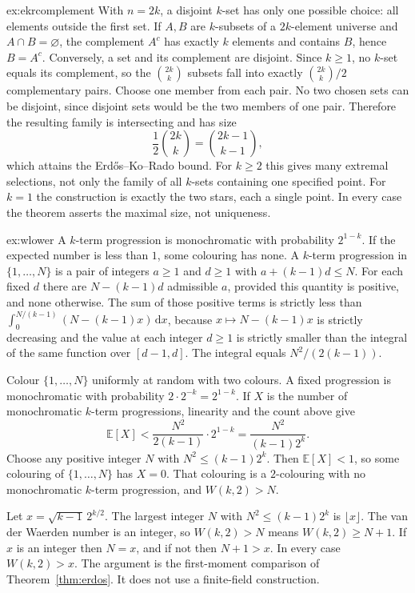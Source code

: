 \begin{solution}{ex:ekrcomplement}
\idea With $n=2k$, a disjoint $k$-set has only one possible choice: all elements outside the first set.
\writeup If $A,B$ are $k$-subsets of a $2k$-element universe and $A\cap B=\varnothing$, the complement $A^c$ has exactly $k$ elements and contains $B$, hence $B=A^c$. Conversely, a set and its complement are disjoint. Since $k\ge1$, no $k$-set equals its complement, so the $\binom{2k}{k}$ subsets fall into exactly $\binom{2k}{k}/2$ complementary pairs. Choose one member from each pair. No two chosen sets can be disjoint, since disjoint sets would be the two members of one pair. Therefore the resulting family is intersecting and has size
\[
 \frac12\binom{2k}{k}=\binom{2k-1}{k-1},
\]
which attains the Erd\H os--Ko--Rado bound. For $k\ge 2$ this gives many extremal selections, not only the family of all $k$-sets containing one specified point. For $k=1$ the construction is exactly the two stars, each a single point. In every case the theorem asserts the maximal size, not uniqueness.
\end{solution}


\begin{solution}{ex:wlower}
\idea A $k$-term progression is monochromatic with probability $2^{1-k}$. If the expected number is less than $1$, some colouring has none.
\writeup A $k$-term progression in $\{1,\ldots,N\}$ is a pair of integers $a\ge1$ and $d\ge1$ with $a+(k-1)d\le N$. For each fixed $d$ there are $N-(k-1)d$ admissible $a$, provided this quantity is positive, and none otherwise. The sum of those positive terms is strictly less than $\int_0^{N/(k-1)}(N-(k-1)x)\,\mathrm dx$, because $x\mapsto N-(k-1)x$ is strictly decreasing and the value at each integer $d\ge1$ is strictly smaller than the integral of the same function over $[d-1,d]$. The integral equals $N^2/(2(k-1))$.

Colour $\{1,\ldots,N\}$ uniformly at random with two colours. A fixed progression is monochromatic with probability $2\cdot 2^{-k}=2^{1-k}$. If $X$ is the number of monochromatic $k$-term progressions, linearity and the count above give
\[
 \mathbb E[X]<\frac{N^2}{2(k-1)}\cdot 2^{1-k}=\frac{N^2}{(k-1)2^{k}}.
\]
Choose any positive integer $N$ with $N^2\le(k-1)2^k$. Then $\mathbb E[X]<1$, so some colouring of $\{1,\ldots,N\}$ has $X=0$. That colouring is a $2$-colouring with no monochromatic $k$-term progression, and $W(k,2)>N$.

Let $x=\sqrt{k-1}\,2^{k/2}$. The largest integer $N$ with $N^2\le(k-1)2^k$ is $\lfloor x\rfloor$. The van der Waerden number is an integer, so $W(k,2)>N$ means $W(k,2)\ge N+1$. If $x$ is an integer then $N=x$, and if not then $N+1>x$. In every case $W(k,2)>x$. The argument is the first-moment comparison of Theorem~\ref{thm:erdos}. It does not use a finite-field construction.
\end{solution}

